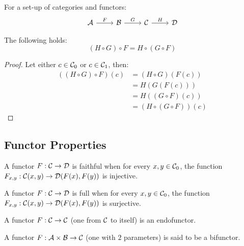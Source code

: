 \begin{theorem}
  For a set-up of categories and functors:
  \[\begin{tikzcd}[ampersand replacement=\&]
    \A \& \B \& \C \& \D
    \arrow["F", from=1-1, to=1-2]
    \arrow["G", from=1-2, to=1-3]
    \arrow["H", from=1-3, to=1-4]
  \end{tikzcd}\]

  The following holds:
  \[(H \circ G) \circ F = H\circ(G\circ F)\]

  \begin{proof}
    Let either $c\in \mathcal{C}_0$ or $c\in \mathcal{C}_1$, then:
    \[
      \begin{aligned}
        ((H \circ G) \circ F) (c)
          &= (H\circ G) (F (c))\\
          &= H(G(F(c)))\\
          &= H((G\circ F)(c))\\
          &= (H\circ(G\circ F)) (c)
      \end{aligned}
    \]
  \end{proof}
\end{theorem}

\subsection{Functor Properties}

\begin{definition}
  A functor $F:\mathcal{C}\to \mathcal{D}$ is faithful when for every $x,y\in \mathcal{C}_0$, the function
  $F_{x, y}: \mathcal{C}(x, y) \to \mathcal{D}(F(x), F(y))$ is injective.
  \parencite{awodey:category_theory}
\end{definition}

\begin{definition}
  A functor $F:\mathcal{C}\to \mathcal{D}$ is full when for every $x,y\in \mathcal{C}_0$, the function
  $F_{x, y}: \mathcal{C}(x, y) \to \mathcal{D}(F(x), F(y))$ is surjective.
  \parencite{adamek_herrlich_strecker:joy_cats}
\end{definition}

\begin{definition}
  A functor $F:\mathcal{C}\to \mathcal{C}$ (one from $\mathcal{C}$ to itself) is an endofunctor.
  \parencite{adamek_herrlich_strecker:joy_cats}
\end{definition}

\begin{definition}
  A functor $F:\mathcal{A}\times \mathcal{B} \to \mathcal{C}$ (one with $2$ parameters) is said to be a
  bifunctor.
  \parencite{lane:working_mathematician}
\end{definition}
